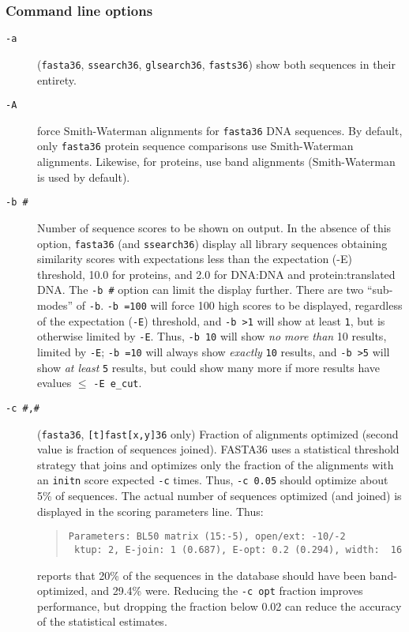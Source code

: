 \documentclass[11pt]{article}
\begin{document}
\subsubsection{Command line options}
\begin{description}
\item[\texttt{-a}] (\texttt{fasta36}, \texttt{ssearch36},
  \texttt{glsearch36}, \texttt{fasts36}) show both sequences in their
  entirety.
\item[\texttt{-A}] force Smith-Waterman alignments for
  \texttt{fasta36} DNA sequences.  By default, only \texttt{fasta36}
  protein sequence comparisons use Smith-Waterman alignments.
  Likewise, for proteins, use band alignments (Smith-Waterman is used
  by default).
\item[\texttt{-b \#}] Number of sequence scores to be shown on output.
  In the absence of this option, \texttt{fasta36} (and
  \texttt{ssearch36}) display all library sequences obtaining
  similarity scores with expectations less than the expectation (-E)
  threshold, 10.0 for proteins, and 2.0 for DNA:DNA and
  protein:translated DNA.  The \texttt{-b \#} option can limit the
  display further.  There are two ``sub-modes'' of \texttt{-b}.
  \texttt{-b =100} will force 100 high scores to be displayed,
  regardless of the expectation (\texttt{-E}) threshold, and
  \texttt{-b >1} will show at least \texttt{1}, but is otherwise
  limited by \texttt{-E}.  Thus, \texttt{-b 10} will show \emph{no
    more than} 10 results, limited by \texttt{-E}; \texttt{-b =10}
  will always show \emph{exactly} \texttt{10} results, and \texttt{-b
    >5} will show \emph{at least} \texttt{5} results, but could show
  many more if more results have e\-values $\le$ \texttt{-E e\_cut}.
\item[\texttt{-c \#,\#}] (\texttt{fasta36}, \texttt{[t]fast[x,y]36}
  only) Fraction of alignments optimized (second value is fraction of
  sequences joined). FASTA36 uses a statistical threshold strategy
  that joins and optimizes only the fraction of the alignments with an
  \texttt{initn} score expected \texttt{-c} times.  Thus, \texttt{-c
    0.05} should optimize about 5\% of sequences.  The actual number
  of sequences optimized (and joined) is displayed in the scoring
  parameters line.  Thus:
\begin{quote}
\begin{verbatim}
Parameters: BL50 matrix (15:-5), open/ext: -10/-2
 ktup: 2, E-join: 1 (0.687), E-opt: 0.2 (0.294), width:  16
\end{verbatim}
\end{quote}
reports that 20\% of the sequences in the database should have been
band-optimized, and 29.4\% were. Reducing the \texttt{-c opt} fraction
improves performance, but dropping the fraction below 0.02 can
reduce the accuracy of the statistical estimates.


\end{description}
\end{document}
